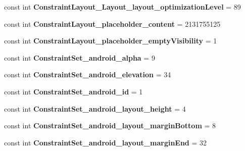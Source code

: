 \begin{DoxyCompactItemize}
const int {\bfseries Constraint\+Layout\+\_\+\+Layout\+\_\+layout\+\_\+optimization\+Level} = 89
\item 
\mbox{\label{classst_delivery_1_1_resource_1_1_styleable_a5cf6c9304b7e1d674964ae6542ef6ab9}} 
const int {\bfseries Constraint\+Layout\+\_\+placeholder\+\_\+content} = 2131755125
\item 
\mbox{\label{classst_delivery_1_1_resource_1_1_styleable_a8c46b3b830a3af910de457ecba1780ff}} 
const int {\bfseries Constraint\+Layout\+\_\+placeholder\+\_\+empty\+Visibility} = 1
\item 
\mbox{\label{classst_delivery_1_1_resource_1_1_styleable_ae8317bf85cb2dbe1139d4e73ac4b06fc}} 
const int {\bfseries Constraint\+Set\+\_\+android\+\_\+alpha} = 9
\item 
\mbox{\label{classst_delivery_1_1_resource_1_1_styleable_a79d510a3b2b68fa43dea93bf5eb4e201}} 
const int {\bfseries Constraint\+Set\+\_\+android\+\_\+elevation} = 34
\item 
\mbox{\label{classst_delivery_1_1_resource_1_1_styleable_ab0b35cf77ab11f98b699c2c9ca298535}} 
const int {\bfseries Constraint\+Set\+\_\+android\+\_\+id} = 1
\item 
\mbox{\label{classst_delivery_1_1_resource_1_1_styleable_a17c288fa7aa17ef055491b58c2552d45}} 
const int {\bfseries Constraint\+Set\+\_\+android\+\_\+layout\+\_\+height} = 4
\item 
\mbox{\label{classst_delivery_1_1_resource_1_1_styleable_aa28e43450b27a5b8713e8d5e2ad09acb}} 
const int {\bfseries Constraint\+Set\+\_\+android\+\_\+layout\+\_\+margin\+Bottom} = 8
\item 
\mbox{\label{classst_delivery_1_1_resource_1_1_styleable_a481a17a9c9d2f177bfa62acb48892d34}} 
const int {\bfseries Constraint\+Set\+\_\+android\+\_\+layout\+\_\+margin\+End} = 32
\item 

\end{DoxyCompactItemize}
